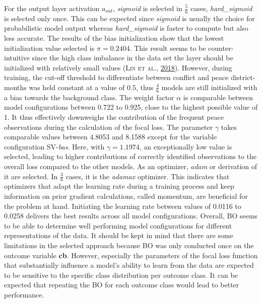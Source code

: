 \documentclass[a4paper,11pt]{article}
\begin{document}
For the output layer activation \(a_{out}\), \emph{sigmoid} is selected in \(\frac{5}{6}\)
cases, \emph{hard\_sigmoid} is selected only once. This can be expected since \emph{sigmoid}
is usually the choice for probabilistic model output whereas \emph{hard\_sigmoid} is faster
to compute but also less accurate. The results of the bias initialization show
that the lowest initialization value selected is \(\pi = 0.2404\).
This result seems to be counter-intuitive since the high class imbalance
in the data set the layer should be initialized with relatively small values \textsc{(\textnormal{\textsc{Lin} \textsc{et al.}}, \textnormal{\protect\hyperlink{ref-lin2018}{2018}})}.
However, during training, the cut-off threshold to differentiate between conflict
and peace district-months was held constant at a value of 0.5, thus \(\frac{4}{6}\)
models are still initialized with a bias towards the background class. The weight
factor \(\alpha\) is comparable between model configurations between 0.722 to 0.925,
close to the highest possible value of 1. It thus effectively downweighs the
contribution of the frequent peace observations during the calculation of the focal loss.
The parameter \(\gamma\) takes comparable values between 4.8053 and 8.1588 except
for the variable configuration SV-\emph{bas}. Here, with \(\gamma = 1.1974\), an exceptionally
low value is selected, leading to higher contributions of correctly identified observations to
the overall loss compared to the other models. As an optimizer, \emph{adam} or derivation of it
are selected. In \(\frac{3}{6}\) cases, it is the \emph{adamax} optimizer. This indicates
that optimizers that adapt the learning rate during a training process and keep
information on prior gradient calculations, called momentum, are beneficial
for the problem at hand. Initiating the learning rate between values of 0.0116 to
0.0258 delivers the best results across all model configurations.
Overall, BO seems to be able to determine well performing model configurations for
different representations of the data. It should be kept in mind that there are
some limitations in the selected approach because BO was only conducted once
on the outcome variable \textbf{cb}. However, especially the parameters of the focal
loss function that substantially influence a model's ability to learn
from the data are expected to be sensitive to the specific class distribution
per outcome class. It can be expected that repeating the BO for each outcome class
would lead to better performance.
\end{document}
